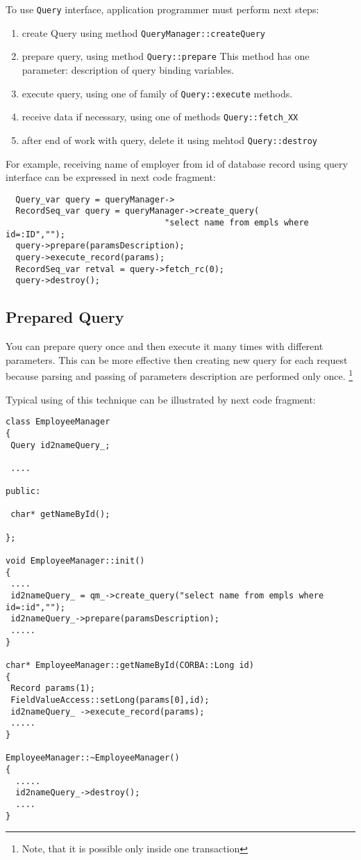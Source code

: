 \documentclass[10pt]{article}
\begin{document}
 To use \verb|Query| interface, application programmer must perform
 next steps:


 \begin{enumerate}
   \item create Query using method \verb|QueryManager::createQuery|
   \item prepare query, using method \verb|Query::prepare| 
   This method has one parameter: description of query binding variables.
   \item execute query, using one of family of \verb|Query::execute| methods.
   \item receive data if necessary, using one of methods 
  \verb|Query::fetch_XX|
   \item after end of work with query, delete it using mehtod \verb|Query::destroy|
 \end{enumerate}

  For example, receiving name of employer from id of database record 
 using query interface can be expressed in next code fragment:
 

\begin{verbatim}
  Query_var query = queryManager->
  RecordSeq_var query = queryManager->create_query(
                                "select name from empls where id=:ID","");
  query->prepare(paramsDescription); 
  query->execute_record(params);
  RecordSeq_var retval = query->fetch_rc(0); 
  query->destroy();
\end{verbatim}


\subsection { Prepared Query }

 You can prepare query once and then execute it many times
with different parameters. This can be more effective then creating
 new query for each request  because parsing and passing of parameters
description are performed only once. \footnote{Note, that it is possible 
 only inside one transaction }

 Typical using of this technique can be illustrated by next code fragment:

\begin{verbatim}
class EmployeeManager
{
 Query id2nameQuery_;
  
 ....
 
public:

 char* getNameById();

};

void EmployeeManager::init()
{
 ....
 id2nameQuery_ = qm_->create_query("select name from empls where id=:id","");
 id2nameQuery_->prepare(paramsDescription);
 .....
}

char* EmployeeManager::getNameById(CORBA::Long id)
{
 Record params(1);
 FieldValueAccess::setLong(params[0],id);
 id2nameQuery_ ->execute_record(params); 
 .....
}

EmployeeManager::~EmployeeManager()
{
  .....
  id2nameQuery_->destroy();
  ....
}

\end{verbatim}
\end{document}
